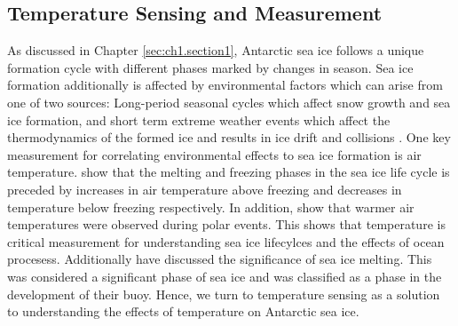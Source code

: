 \subsection{Temperature Sensing and Measurement}

As discussed in Chapter \ref{sec:ch1.section1}, Antarctic sea ice follows a unique formation cycle with different phases marked by changes in season. Sea ice formation additionally is affected by environmental factors which can arise from one of two sources: Long-period seasonal cycles \cite{barber2005microwave} which affect snow growth and sea ice formation, and short term extreme weather events \cite{vichi2019effects,albarello2020drift} which affect the thermodynamics of the formed ice and results in ice drift and collisions \cite{arrigo2004large}. One key measurement for correlating environmental effects to sea ice formation is air temperature. \textcite{barber2005microwave} show that  the melting and freezing phases in the sea ice life cycle is preceded by increases in air temperature above freezing and decreases in temperature below freezing respectively. In addition, \textcite{vichi2019effects} show that warmer air temperatures were observed during polar events. This shows that temperature is critical measurement for understanding sea ice lifecylces and the effects of ocean procesess. Additionally \textcite{kohout2015device,doble2017robust,doble2017robust} have discussed the significance of sea ice melting. This was considered a significant phase of sea ice and was classified as a phase in the development of their buoy. Hence, we turn to temperature sensing as a solution to understanding the effects of temperature on Antarctic sea ice.\par 

